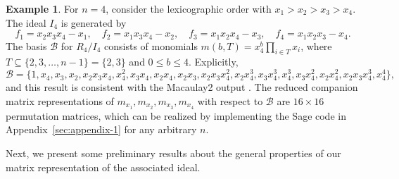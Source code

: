 \documentclass[11pt]{amsart}
\theoremstyle{plain}
\theoremstyle{definition}
\newtheorem{ex}[theorem]{Example}
\theoremstyle{remark}
\begin{document}
\begin{ex} 
	For \( n = 4 \), consider the lexicographic order with \( x_1 > x_2 > x_3 > x_4 \). The ideal \( I_4 \) is generated by
	\[
	f_1 = x_2x_3x_4 - x_1, \quad f_2 = x_1x_3x_4 - x_2, \quad f_3 = x_1x_2x_4 - x_3, \quad f_4 = x_1x_2x_3 - x_4.
	\]
	The basis \( \mathcal{B} \) for \( R_4 / I_4 \) consists of monomials \( m(b, T) = \displaystyle x_4^b \prod_{i \in T} x_i \), where \( T \subseteq \{2, 3, \dots, n-1\} = \{2, 3\} \) and \( 0 \leq b \leq 4 \).  Explicitly, 
	\[
	\mathcal{B} = \{1, x_4, x_3, x_2, x_2x_3x_4, x_4^2, x_3x_4, x_2x_4, x_2x_3, x_2x_3x_4^2, x_2x_4^3, x_3x_4^3, x_4^3, x_3x_4^2, x_2x_4^2, x_2x_3x_4^3, x_4^4\},
	\] and this result is consistent with the Macaulay2 output \cite{Grayson2001}. The reduced companion matrix representations of \( m_{x_1}, m_{x_2}, m_{x_3}, m_{x_4} \) with respect to \( \mathcal{B} \) are \( 16 \times 16 \) permutation matrices, which can be realized by implementing the Sage code in Appendix~\ref{sec:appendix-1} for any arbitrary \(n\).
	
\end{ex}

Next, we present some preliminary results about the general properties of our matrix representation of the associated ideal.
\end{document}
